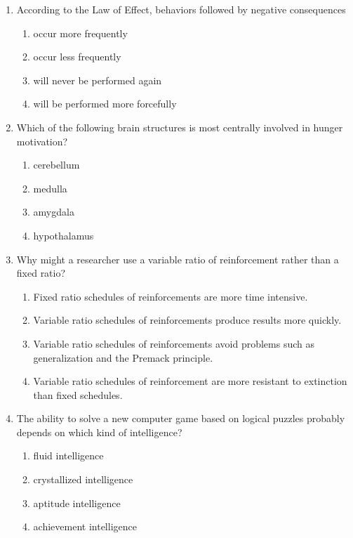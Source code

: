 \documentclass[12pt]{article}
\begin{document}
\begin{enumerate}[label=\arabic*.]
\begin{enumerate}[label=(\alph*)]
    \item right temporal
    \item right parietal
    \item left temporal
\end{enumerate}
\item According to the Law of Effect, behaviors followed by negative consequences
\begin{enumerate}[label=(\alph*)]
    \item occur more frequently
    \item occur less frequently
    \item will never be performed again
    \item will be performed more forcefully
\end{enumerate}
\item Which of the following brain structures is most centrally involved in hunger motivation?
\begin{enumerate}[label=(\alph*)]
    \item cerebellum
    \item medulla
    \item amygdala
    \item hypothalamus
\end{enumerate}
\item Why might a researcher use a variable ratio of reinforcement rather than a fixed ratio?
\begin{enumerate}[label=(\alph*)]
    \item Fixed ratio schedules of reinforcements are more time intensive.
    \item Variable ratio schedules of reinforcements produce results more quickly.
    \item Variable ratio schedules of reinforcements avoid problems such as generalization and the Premack principle.
    \item Variable ratio schedules of reinforcement are more resistant to extinction than fixed schedules.
\end{enumerate}
\item The ability to solve a new computer game based on logical puzzles probably depends on which kind of intelligence?
\begin{enumerate}[label=(\alph*)]
    \item fluid intelligence
    \item crystallized intelligence
    \item aptitude intelligence
    \item achievement intelligence

\end{enumerate}
\end{enumerate}
\end{document}
